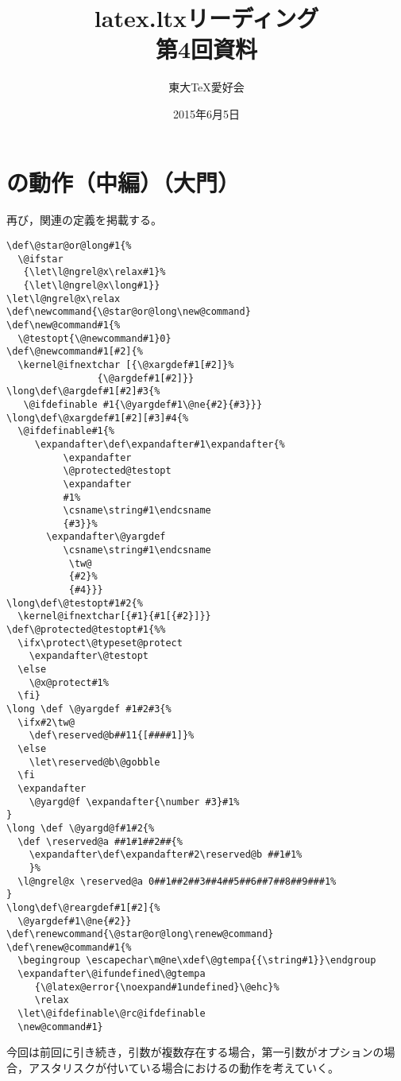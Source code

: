 \documentclass[autodetect-engine,dvipdfmx]{jsarticle}
\begin{document}
\title{ latex.ltxリーディング \\ 第4回資料 }
\author{ 東大\TeX 愛好会 }
\date{2015年6月5日}
\maketitle

\section{の動作（中編）（大門）}

再び，関連の定義を掲載する。

\latexltx
\begin{lstlisting}[firstnumber=589]
\def\@star@or@long#1{%
  \@ifstar
   {\let\l@ngrel@x\relax#1}%
   {\let\l@ngrel@x\long#1}}
\let\l@ngrel@x\relax
\def\newcommand{\@star@or@long\new@command}
\def\new@command#1{%
  \@testopt{\@newcommand#1}0}
\def\@newcommand#1[#2]{%
  \kernel@ifnextchar [{\@xargdef#1[#2]}%
                {\@argdef#1[#2]}}
\long\def\@argdef#1[#2]#3{%
   \@ifdefinable #1{\@yargdef#1\@ne{#2}{#3}}}
\long\def\@xargdef#1[#2][#3]#4{%
  \@ifdefinable#1{%
     \expandafter\def\expandafter#1\expandafter{%
          \expandafter
          \@protected@testopt
          \expandafter
          #1%
          \csname\string#1\endcsname
          {#3}}%
       \expandafter\@yargdef
          \csname\string#1\endcsname
           \tw@
           {#2}%
           {#4}}}
\long\def\@testopt#1#2{%
  \kernel@ifnextchar[{#1}{#1[{#2}]}}
\def\@protected@testopt#1{%%
  \ifx\protect\@typeset@protect
    \expandafter\@testopt
  \else
    \@x@protect#1%
  \fi}
\long \def \@yargdef #1#2#3{%
  \ifx#2\tw@
    \def\reserved@b##11{[####1]}%
  \else
    \let\reserved@b\@gobble
  \fi
  \expandafter
    \@yargd@f \expandafter{\number #3}#1%
}
\long \def \@yargd@f#1#2{%
  \def \reserved@a ##1#1##2##{%
    \expandafter\def\expandafter#2\reserved@b ##1#1%
    }%
  \l@ngrel@x \reserved@a 0##1##2##3##4##5##6##7##8##9###1%
}
\long\def\@reargdef#1[#2]{%
  \@yargdef#1\@ne{#2}}
\def\renewcommand{\@star@or@long\renew@command}
\def\renew@command#1{%
  \begingroup \escapechar\m@ne\xdef\@gtempa{{\string#1}}\endgroup
  \expandafter\@ifundefined\@gtempa
     {\@latex@error{\noexpand#1undefined}\@ehc}%
     \relax
  \let\@ifdefinable\@rc@ifdefinable
  \new@command#1}
\end{lstlisting}

今回は前回に引き続き，引数が複数存在する場合，第一引数がオプションの場合，アスタリスクが付いている場合におけるの動作を考えていく。
\end{document}
